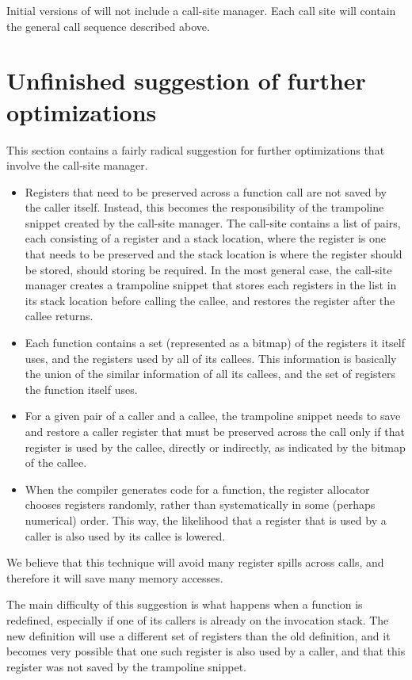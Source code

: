 Initial versions of \sysname{} will not include a call-site manager.
Each call site will contain the general call sequence described
above.

\section{Unfinished suggestion of further optimizations}

This section contains a fairly radical suggestion for further
optimizations that involve the call-site manager.

\begin{itemize}
\item Registers that need to be preserved across a function call are
  not saved by the caller itself.  Instead, this becomes the
  responsibility of the trampoline snippet created by the call-site
  manager.  The call-site contains a list of pairs, each consisting of
  a register and a stack location, where the register is one that
  needs to be preserved and the stack location is where the register
  should be stored, should storing be required.  In the most general
  case, the call-site manager creates a trampoline snippet that stores
  each registers in the list in its stack location before calling the
  callee, and restores the register after the callee returns.
\item Each function contains a set (represented as a bitmap) of the
  registers it itself uses, and the registers used by all of its
  callees.  This information is basically the union of the similar
  information of all its callees, and the set of registers the
  function itself uses.
\item For a given pair of a caller and a callee, the trampoline
  snippet needs to save and restore a caller register that must be
  preserved across the call only if that register is used by the
  callee, directly or indirectly, as indicated by the bitmap of the
  callee.
\item When the compiler generates code for a function, the register
  allocator chooses registers randomly, rather than systematically in
  some (perhaps numerical) order.  This way, the likelihood that a
  register that is used by a caller is also used by its callee is
  lowered.
\end{itemize}

We believe that this technique will avoid many register spills across
calls, and therefore it will save many memory accesses.

The main difficulty of this suggestion is what happens when a function
is redefined, especially if one of its callers is already on the
invocation stack.  The new definition will use a different set of
registers than the old definition, and it becomes very possible that
one such register is also used by a caller, and that this register was
not saved by the trampoline snippet.

